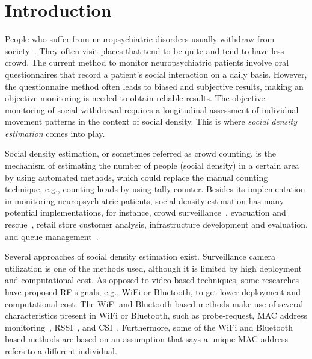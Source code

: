 \chapter{Introduction}\label{ch:introduction}

People who suffer from neuropsychiatric disorders usually withdraw from society~\cite{thesis084,thesis083}. They often visit places that tend to be quite and tend to have less crowd. The current method to monitor neuropsychiatric patients involve oral questionnaires that record a patient's social interaction on a daily basis. However, the questionnaire method often leads to biased and subjective results, making an objective monitoring is needed to obtain reliable results.
The objective monitoring of social withdrawal requires a longitudinal assessment of individual movement patterns in the context of social density.
This is where \textit{social density estimation} comes into play.

Social density estimation, or sometimes referred as crowd counting, is the mechanism of estimating the number of people (social density) in a certain area by using automated methods, which could replace the manual counting technique, e.g., counting heads by using tally counter. Besides its implementation in monitoring neuropsychiatric patients, social density estimation has many potential implementations, for instance, crowd surveillance~\cite{thesis050}, evacuation and rescue~\cite{thesis045}, retail store customer analysis, infrastructure development and evaluation, and queue management~\cite{thesis012}.

Several approaches of social density estimation exist. Surveillance camera utilization is one of the methods used, although it is limited by high deployment and computational cost. As opposed to video-based techniques, some researches have proposed \ac{RF} signals, e.g., WiFi or Bluetooth, to get lower deployment and computational cost. The WiFi and Bluetooth based methods make use of several characteristics present in WiFi or Bluetooth, such as probe-request, \ac{MAC} address monitoring~\cite{thesis008}, \ac{RSSI}~\cite{thesis046}, and \ac{CSI}~\cite{thesis051}. 
Furthermore, some of the WiFi and Bluetooth based methods are based on an assumption that says a unique \ac{MAC} address refers to a different individual.

